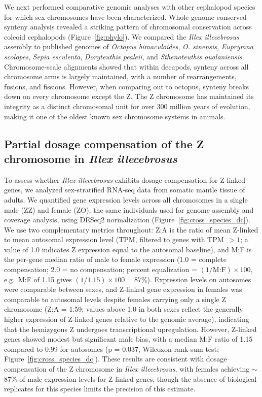 \documentclass[12pt]{article}
\newcommand{\illex}{\textit{Illex illecebrosus}\xspace}
\begin{document}
We next performed comparative genomic analyses with other cephalopod species for which sex chromosomes have been characterized.
Whole-genome conserved synteny analysis revealed a striking pattern of chromosomal conservation across coleoid cephalopods (Figure~\ref{fig:phylo}).
We compared the \illex assembly to published genomes of
\textit{Octopus bimaculoides}, \textit{O. sinensis}, \textit{Euprymna scolopes}, \textit{Sepia esculenta}, \textit{Doryteuthis pealeii}, and \textit{Sthenoteuthis oualaniensis}.
Chromosome-scale alignments showed that within decapods, synteny across all chromosome arms
is largely maintained, with a number of rearrangements, fusions, and fissions.
However, when comparing out to octopus, synteny breaks down on every chromosome except the Z.
The Z chromosome has maintained its integrity as a distinct chromosomal unit for over 300 million years of evolution,
making it one of the oldest known sex chromosome systems in animals.

\subsection*{Partial dosage compensation of the Z chromosome in \illex}

To assess whether \illex exhibits dosage compensation for Z-linked genes,
we analyzed sex-stratified RNA-seq data from somatic mantle tissue of adults.
We quantified gene expression levels across all chromosomes in a single male (ZZ) and female (ZO),
the same individuals used for genome assembly and coverage analysis,
using DESeq2 normalization (Figure~\ref{fig:cross_species_dc}).
We use two complementary metrics throughout:
Z:A is the ratio of mean Z-linked to mean autosomal expression level (TPM, filtered to genes with TPM~$> 1$;
a value of 1.0 indicates Z expression equal to the autosomal baseline),
and M:F is the per-gene median ratio of male to female expression
(1.0 = complete compensation; 2.0 = no compensation;
percent equalization = $(1/\text{M:F}) \times 100$,
e.g.\ M:F of 1.15 gives $(1/1.15) \times 100 = 87\%$).
Expression levels on autosomes were comparable between sexes,
and Z-linked gene expression in females was comparable to autosomal levels
despite females carrying only a single Z chromosome (Z:A = 1.59;
values above 1.0 in both sexes reflect the generally higher expression
of Z-linked genes relative to the genomic average),
indicating that the hemizygous Z undergoes transcriptional upregulation.
However, Z-linked genes showed modest but significant male bias,
with a median M:F ratio of 1.15 compared to 0.99 for autosomes
(p = 0.037, Wilcoxon rank-sum test; Figure~\ref{fig:cross_species_dc}).
These results are consistent with dosage compensation of the Z chromosome in \illex,
with females achieving $\sim$87\% of male expression levels for Z-linked genes,
though the absence of biological replicates for this species
limits the precision of this estimate.
\end{document}
